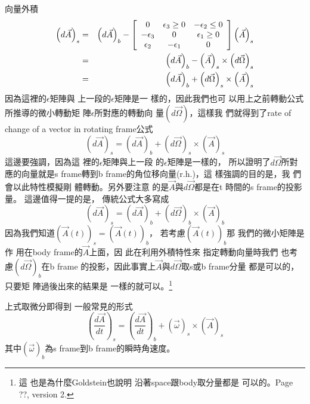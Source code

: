 \documentclass[12pt,a4paper]{article}
\begin{document}
向量外積%
\begin{eqnarray*}
\left( d\vec{A}\right) _{s} &=&\left( d\vec{A}\right) _{b}-\left[ 
\begin{array}{ccc}
0 & \epsilon _{3}\geq 0 & -\epsilon _{2}\leq 0 \\ 
-\epsilon _{3} & 0 & \epsilon _{1}\geq 0 \\ 
\epsilon _{2} & -\epsilon _{1} & 0%
\end{array}%
\right] \left( \vec{A}\right) _{s} \\
&=&\left( d\vec{A}\right) _{b}-\left( \vec{A}\right) _{s}\times \left( d\vec{%
\Omega}\right) _{s} \\
&=&\left( d\vec{A}\right) _{b}+\left( d\vec{\Omega}\right) _{s}\times \left( 
\vec{A}\right) _{s}
\end{eqnarray*}%
因為這裡的$\epsilon $矩陣與%
上一段的$\epsilon $矩陣是一%
樣的，因此我們也可%
以用上之前轉動公式%
所推導的微小轉動矩%
陣$\epsilon $所對應的轉動向%
量$\left( d\vec{\Omega}\right) $，這樣我%
們就得到了rate of change of a vector in
rotating frame公式%
\begin{equation}
\left( d\vec{A}\right) _{s}=\left( d\vec{A}\right) _{b}+\left( d\vec{\Omega}%
\right) _{s}\times \left( \vec{A}\right) _{s}
\end{equation}%
這邊要強調，因為這%
裡的$\epsilon $矩陣與上一段%
的$\epsilon $矩陣是一樣的，%
所以證明了$d\vec{\Omega}$所對%
應的向量就是s frame轉到b
frame的角位移向量(r.h.)，這%
樣強調的目的是，我%
們會以此特性模擬剛%
體轉動。另外要注意%
的是$\vec{A}$與$d\vec{\Omega}$都是在t%
時間的s frame的投影量。%
這邊值得一提的是，%
傳統公式大多寫成%
\begin{equation*}
\left( d\vec{A}\right) _{s}=\left( d\vec{A}\right) _{b}+\left( d\vec{\Omega}%
\right) _{b}\times \left( \vec{A}\right) _{b}
\end{equation*}%
因為我們知道$\left( \vec{A}\left(
t\right) \right) _{s}=\left( \vec{A}\left( t\right) \right) _{b}$，%
若考慮$\left( \vec{A}\left( t\right) \right) _{b}$那%
我們的微小矩陣是作%
用在body frame的$\vec{A}$上面，因%
此在利用外積特性來%
指定轉動向量時我們%
也考慮$\left( d\vec{\Omega}\right) _{b}$在b frame%
的投影$， $因此事實上$%
\vec{A}$與$d\vec{\Omega}$取s或b frame分量%
都是可以的，只要矩%
陣過後出來的結果是%
一樣的就可以。\footnote{這%
也是為什麼Goldstein也說明%
沿著space跟body取分量都是%
可以的。Page ??, version 2.}

\bigskip 上式取微分即得到%
一般常見的形式%
\begin{equation}
\left( \frac{d\vec{A}}{dt}\right) _{s}=\left( \frac{d\vec{A}}{dt}\right)
_{b}+\left( \vec{\omega}\right) _{s}\times \left( \vec{A}\right) _{s}
\label{rateofchange}
\end{equation}%
其中$\left( \vec{\omega}\right) _{b}$為s frame到b
frame的瞬時角速度。
\end{document}
